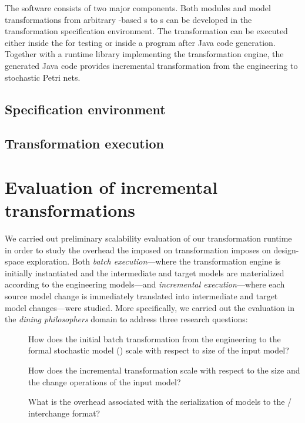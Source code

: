 The software consists of two major components. Both  modules and model transformations from arbitrary -based s to s can be developed in the transformation specification environment. The transformation can be executed either inside the  for testing or inside a  program after Java code generation. Together with a runtime library implementing the transformation engine, the generated Java code provides incremental transformation from the engineering  to stochastic Petri nets.

\subsection{Specification environment}

\subsection{Transformation execution}

\section{Evaluation of incremental transformations}

We carried out preliminary scalability evaluation of our transformation runtime in order to study the overhead the imposed on transformation imposes on design-space exploration. Both \emph{batch execution}---where the transformation engine is initially instantiated and the intermediate and target  models are materialized according to the engineering models---and \emph{incremental execution}---where each source model change is immediately translated into intermediate and target model changes---were studied. More specifically, we carried out the evaluation in the \emph{dining philosophers} domain to address three research questions:
\begin{description}
\item[] How does the initial batch transformation from the engineering  to the formal stochastic model () scale with respect to size of the input model?
\item[] How does the incremental transformation scale with respect to the size and the change operations of the input model?
\item[] What is the overhead associated with the serialization of models to the /  interchange format?
\end{description}


